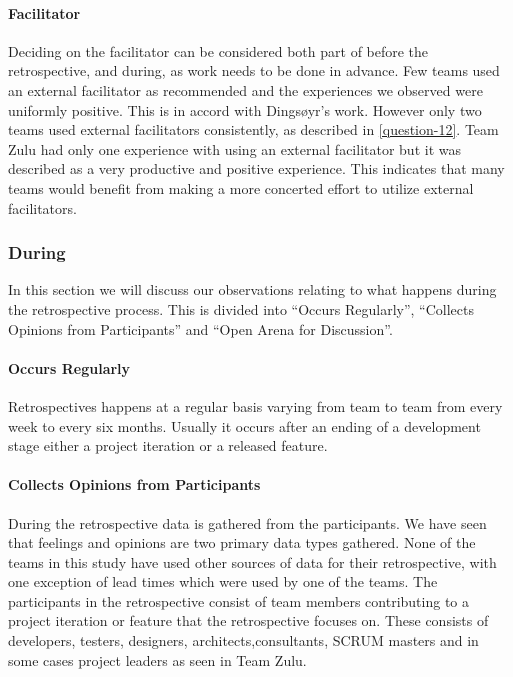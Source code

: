 \paragraph{Facilitator}
\label{section:facilitator}
Deciding on the facilitator can be considered both part of before the retrospective, and during, as work needs to be done in advance. Few teams used an external facilitator as recommended and the experiences we observed were uniformly positive. This is in accord with Dingsøyr's work. However only two teams used external facilitators consistently, as described in \autoref{question-12}. Team Zulu had only one experience with using an external facilitator but it was described as a very productive and positive experience. This indicates that many teams would benefit from making a more concerted effort to utilize external facilitators. 

\subsubsection{During}
In this section we will discuss our observations relating to what happens during the retrospective process. This is divided into ``Occurs Regularly'', ``Collects Opinions from Participants'' and ``Open Arena for Discussion''.

\paragraph{Occurs Regularly}
Retrospectives happens at a regular basis varying from team to team from every week to every six months. Usually it occurs after an ending of a development stage either a project iteration or a released feature.

\paragraph{Collects Opinions from Participants}
During the retrospective data is gathered from the participants. We have seen that feelings and opinions are two primary data types gathered. None of the teams in this study have used other sources of data for their retrospective, with one exception of lead times which were used by one of the teams. The participants in the retrospective consist of team members contributing to a project iteration or feature that the retrospective focuses on. These consists of developers, testers, designers, architects,consultants, SCRUM masters and in some cases project leaders as seen in Team Zulu. 

